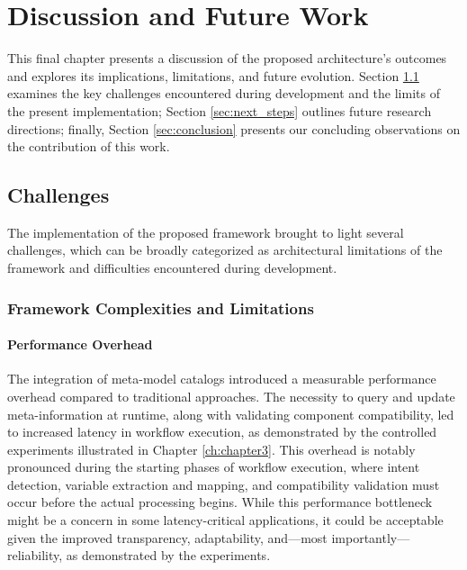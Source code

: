 \chapter{Discussion and Future Work}\label{ch:chapter4}

This final chapter presents a discussion of the proposed architecture's outcomes and explores its implications, limitations, and future evolution. Section \ref{sec:challenge} examines the key challenges encountered during development and the limits of the present implementation; Section \ref{sec:next_steps} outlines future research directions; finally, Section \ref{sec:conclusion} presents our concluding observations on the contribution of this work.


\section{Challenges} \label{sec:challenge}

The implementation of the proposed framework brought to light several challenges, which can be broadly categorized as architectural limitations of the framework and difficulties encountered during development.



\subsection{Framework Complexities and Limitations}


\subsubsection{Performance Overhead}
The integration of meta-model catalogs introduced a measurable performance overhead compared to traditional approaches. The necessity to query and update meta-information at runtime, along with validating component compatibility, led to increased latency in workflow execution, as demonstrated by the controlled experiments illustrated in Chapter \ref{ch:chapter3}.
This overhead is notably pronounced during the starting phases of workflow execution, where intent detection, variable extraction and mapping, and compatibility validation must occur before the actual processing begins. 
While this performance bottleneck might be a concern in some latency-critical applications, it could be acceptable given the improved transparency, adaptability, and—most importantly—reliability, as demonstrated by the experiments.


